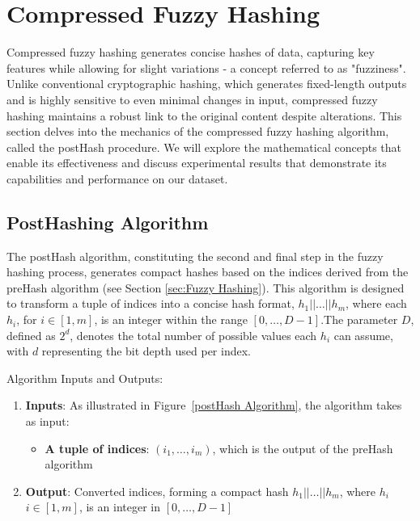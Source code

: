 \newpage


\section{Compressed Fuzzy Hashing}
\label{sec:Compressed Fuzzy Hashing}

Compressed fuzzy hashing generates concise hashes of data, capturing key features while allowing for slight variations - a concept referred to as "fuzziness". Unlike conventional cryptographic hashing, which generates fixed-length outputs and is highly sensitive to even minimal changes in input, compressed fuzzy hashing maintains a robust link to the original content despite alterations.
This section delves into the mechanics of the compressed fuzzy hashing algorithm, called the postHash procedure. We will explore the mathematical concepts that enable its effectiveness and discuss experimental results that demonstrate its capabilities and performance on our dataset.

\subsection{PostHashing Algorithm}

The postHash algorithm, constituting the second and final step in the fuzzy hashing process, generates compact hashes based on the indices derived from the preHash algorithm (see Section \ref{sec:Fuzzy Hashing}). This algorithm is designed to transform a tuple of indices into a concise hash format, \(h_1 || \ldots || h_m\), where each \(h_i\), for \(i \in [1, m]\), is an integer within the range \([0, \ldots, D-1]\).The parameter \(D\), defined as \(2^d\), denotes the total number of possible values each \(h_i\) can assume, with \(d\) representing the bit depth used per index. 

Algorithm Inputs and Outputs:
\begin{enumerate}
    \item \textbf{Inputs}: As illustrated in Figure~\ref{postHash Algorithm}, the algorithm takes as input:
    \begin{itemize}
        \item \textbf{A tuple of indices}: \((i_1, \ldots, i_m)\), which is the output of the preHash algorithm
    \end{itemize}
    \item \textbf{Output}: Converted indices, forming a compact hash \(h_1|| \ldots || h_m\), where \(h_i\) \(i \in [1, m]\), is an integer in \([0, \ldots, D-1]\)
\end{enumerate}

